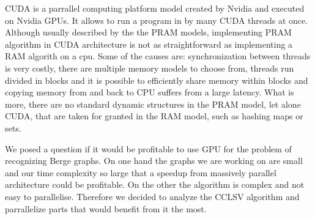 CUDA is a parrallel computing platform model created by Nvidia and executed on Nvidia GPUs. It allows to run a program in by many CUDA threads at once. Although usually described by the the PRAM models, implementing PRAM algorithm in CUDA architecture is not as straightforward as implementing a RAM algorith on a cpu. Some of the causes are: synchronization between threads is very costly, there are multiple memory models to choose from, threads run divided in blocks and it is possible to efficiently share memory within blocks and copying memory from and back to CPU suffers from a large latency. What is more, there are no standard dynamic structures in the PRAM model, let alone CUDA, that are taken for granted in the RAM model, such as hashing maps or sets. 


We posed a question if it would be profitable to use GPU for the problem of recognizing Berge graphs. On one hand the graphs we are working on are small and our time complexity so large that a speedup from massively parallel architecture could be profitable. On the other the algorithm is complex and not easy to parallelise. Therefore we decided to analyze the  CCLSV algorithm and parrallelize parts that would benefit from it the most.





